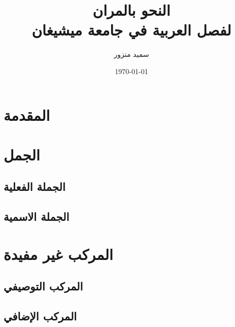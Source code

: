 \documentclass[12pt,twoside]{book}
\title{النحو بالمران\\لفصل العربية في جامعة ميشيغان}
\author{\textarabic{سميد منزور}}
\date{\today} %
\begin{document}
\frontmatter

\maketitle
\thispagestyle{empty} %
\tableofcontents

\pagebreak

\listoffigures
\listoftables


\mainmatter

\chapter{المقدمة}




\chapter{الجمل}



\section{الجملة الفعلية}



\section{الجملة الاسمية}



\chapter{المركب غير مفيدة}



\section{المركب التوصيفي}



\section{المركب الإضافي}
\end{document}
